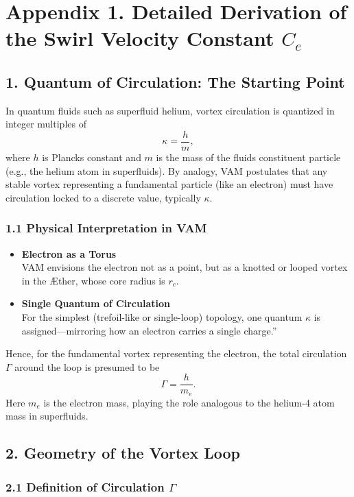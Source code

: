 
\section*{Appendix 1. Detailed Derivation of the Swirl Velocity Constant \(C_e\)}

\subsection*{1. Quantum of Circulation: The Starting Point}

In quantum fluids such as superfluid helium, vortex circulation is quantized in integer multiples of
\[
    \kappa = \frac{h}{m},
\]
where \(h\) is Planck\rqs s constant and \(m\) is the mass of the fluid\rqs s constituent particle (e.g., the helium atom in superfluids). By analogy, VAM postulates that any stable vortex representing a fundamental particle (like an electron) must have circulation locked to a discrete value, typically \(\kappa\).

\subsubsection*{1.1 Physical Interpretation in VAM}
\begin{itemize}
    \item \textbf{Electron as a Torus} \\
    VAM envisions the electron not as a point, but as a knotted or looped vortex in the Æther, whose core radius is \(r_c\).
    \item \textbf{Single Quantum of Circulation} \\
    For the simplest (trefoil-like or single-loop) topology, one quantum \(\kappa\) is assigned—mirroring how an electron carries a single \grqq charge.\textquotedblright
\end{itemize}

Hence, for the fundamental vortex representing the electron, the total circulation \(\Gamma\) around the loop is presumed to be
\[
    \Gamma = \frac{h}{m_e}.
\]
Here \(m_e\) is the electron mass, playing the role analogous to the helium-4 atom mass in superfluids.

\subsection*{2. Geometry of the Vortex Loop}

\subsubsection*{2.1 Definition of Circulation \(\Gamma\)}

